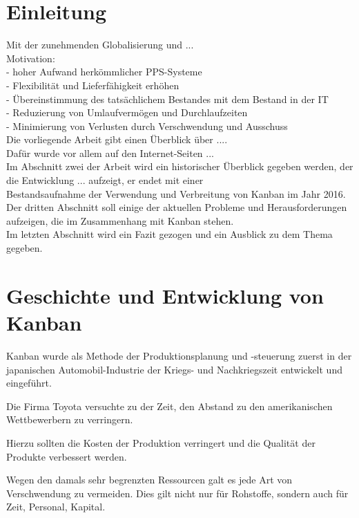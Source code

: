 \section{Einleitung}
Mit der zunehmenden Globalisierung und ...\\
Motivation: \\
- hoher Aufwand herkömmlicher PPS-Systeme\\
- Flexibilität und Lieferfähigkeit erhöhen\\
- Übereinstimmung des tatsächlichem Bestandes mit dem Bestand in der IT\\
- Reduzierung von Umlaufvermögen und Durchlaufzeiten\\
- Minimierung von Verlusten durch Verschwendung und Ausschuss\\

Die vorliegende Arbeit gibt einen Überblick über ....\\
Dafür wurde vor allem auf den Internet-Seiten ...\\

Im Abschnitt zwei der Arbeit wird ein historischer Überblick gegeben 
werden, der die Entwicklung ... aufzeigt, er endet mit einer \\
Bestandsaufnahme der Verwendung und Verbreitung von Kanban im Jahr 2016. \\
Der dritten Abschnitt soll einige der aktuellen Probleme und 
Herausforderungen aufzeigen, die im Zusammenhang mit Kanban stehen. \\
Im letzten Abschnitt wird ein Fazit gezogen und ein Ausblick zu dem Thema gegeben.

\section{Geschichte und Entwicklung von Kanban}

Kanban wurde als Methode der Produktionsplanung und -steuerung zuerst in der 
japanischen Automobil-Industrie der Kriegs- und Nachkriegszeit entwickelt und 
eingeführt.

Die Firma Toyota versuchte zu der Zeit, den Abstand zu den amerikanischen 
Wettbewerbern zu verringern.

Hierzu sollten die Kosten der Produktion verringert und die Qualität der 
Produkte verbessert werden.

Wegen den damals sehr begrenzten Ressourcen galt es jede Art von Verschwendung 
zu vermeiden. Dies gilt nicht nur für Rohstoffe, sondern auch für Zeit, 
Personal, Kapital.

